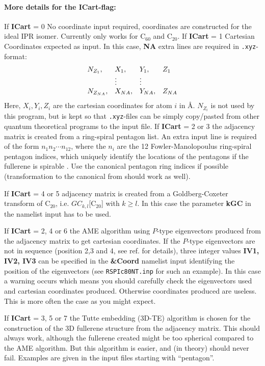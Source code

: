 \documentclass[article,a4paper,twoside]{memoir}
\newcommand{\C}[1]{\ensuremath{\mathrm{C}_{#1}}}
\newcommand{\filename}[1]{\texttt{#1}}
\newcommand{\paramname}[1]{{\color{green}\textbf{#1}}}
\begin{document}
\paragraph{More details for the \paramname{ICart}-flag:} 
If \paramname{ICart} = 0 No coordinate input required, coordinates are constructed for the ideal IPR isomer.
Currently only works for \C{60} and \C{20}.
If \paramname{ICart} = 1 Cartesian Coordinates expected as input. In this case, \paramname{NA} extra lines are required in \filename{.xyz}-format:
\[
\begin{array}{{llll}}
  N_{Z_1},& X_1,& Y_1,& Z_1\\
         &\vdots&\vdots& \\
  N_{{Z_{NA}}},& X_{NA},& Y_{NA},& Z_{NA}\\
\end{array}
\]
Here, $X_i, Y_i, Z_i$ are the cartesian
coordinates for atom $i$ in \AA. $N_{Z_i}$ is not used by
this program, but is kept so that \filename{.xyz}-files can be simply copy/pasted from other quantum theoretical programs to the input file.
If \paramname{ICart} = 2 or 3 the adjacency matrix is created from a ring-spiral pentagon list. An extra input line is required 
of the form $n_1 n_2 \cdots n_{12}$, where the $n_i$ are the 12 Fowler-Manolopoulus ring-spiral
pentagon indices, which uniquely identify the locations of the
pentagons if the fullerene is spirable \cite{Atlas}. Use the canonical
pentagon ring indices if possible (transformation to the canonical from should work as well).

If \paramname{ICart} = 4 or 5 adjacency matrix is created from a Goldberg-Coxeter transform of \C{20}, i.e. $GC_{k,l}$[\C{20}] with $k \geq l$.  
In this case the parameter \paramname{kGC} in the namelist input has to be used.

If \paramname{ICart} = 2, 4 or 6 the AME algorithm using $P$-type eigenvectors produced from the adjacency matrix to get cartesian
coordinates.  If the $P$-type eigenvectors are not in sequence (position 2,3 and 4, see ref.\cite{Atlas} for details), three integer
values \paramname{IV1, IV2, IV3} can be specified in the \paramname{\&Coord} namelist input identifying the position of the eigenvectors (see
\filename{RSPIc80NT.inp} for such an example).  In this case a warning occurs which means you should carefully check the eigenvectors used and
cartesian coordinates produced. Otherwise coordinates produced are useless. This is more often the case as you might expect.

If \paramname{ICart} = 3, 5 or 7 the Tutte embedding (3D-TE) algorithm is chosen for the construction of the 3D fullerene structure from the
adjacency matrix.  This should always work, although the fullerene created might be too spherical compared to the AME algorithm. But this
algorithm is easier, and (in theory) should never fail. Examples are given in the input files starting with ``pentagon''.
\end{document}
